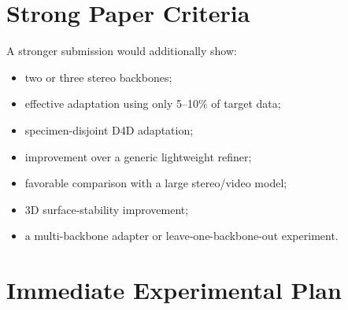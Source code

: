 \documentclass[11pt,a4paper]{article}
\begin{document}
\section{Strong Paper Criteria}

A stronger submission would additionally show:

\begin{itemize}[leftmargin=*]
    \item two or three stereo backbones;
    \item effective adaptation using only 5--10\% of target data;
    \item specimen-disjoint D4D adaptation;
    \item improvement over a generic lightweight refiner;
    \item favorable comparison with a large stereo/video model;
    \item 3D surface-stability improvement;
    \item a multi-backbone adapter or leave-one-backbone-out experiment.
\end{itemize}

\section{Immediate Experimental Plan}
\end{document}
